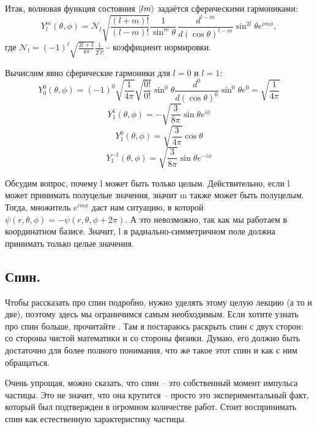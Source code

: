 Итак, волновая функция состояния $\ket{lm}$ задаётся сферическими гармониками:
\[
Y^m_l(\theta, \phi) = \mathcal{N}_l\sqrt{\frac{(l+m)!}{(l-m)!}} \frac{1}{\sin^{m}\theta}\,\frac{d^{l-m}}{d(\cos\theta)^{l-m}}\sin^{2l}\theta e^{im\phi},
\]
где $\mathcal{N}_l = (-1)^l \sqrt{\frac{2l+1}{4\pi}}\frac{1}{2^l l!}$ - коэффициент нормировки.

Вычислим явно сферические гармоники для $l=0$ и $l=1$:
\[
Y^0_0(\theta,\phi) = (-1)^0\sqrt{\frac{1}{4\pi}}\sqrt{\frac{0!}{0!}}\sin^0\theta \frac{d^0}{d(\cos\theta)^0} \sin^0 \theta e^{0} = \sqrt{\frac{1}{4\pi}}
\]
\[
Y^1_1(\theta,\phi) = -\sqrt{\frac{3}{8\pi}}\sin\theta e^{i\phi}
\]
\[
Y^0_1(\theta,\phi) = \sqrt{\frac{3}{4\pi}}\cos\theta
\]
\[
Y^{-1}_1(\theta,\phi) = \sqrt{\frac{3}{8\pi}}\sin\theta e^{-i\phi}
\]

Обсудим вопрос, почему l может быть только целым. Действительно, если l может принимать полуцелые значения, значит m также может быть полуцелым. Тогда, множитель $e^{im\phi}$ даст нам ситуацию, в которой $\psi(r, \theta, \phi) = -\psi(r, \theta, \phi + 2\pi)$. А это невозможно, так как мы работаем в координатном базисе. Значит, l в радиально-симметричном поле должна принимать только целые значения.

\subsection*{Спин.}
Чтобы рассказать про спин подробно, нужно уделять этому целую лекцию (а то и две), поэтому здесь мы ограничимся самым необходимым. Если хотите узнать про спин больше, прочитайте . Там я постараюсь раскрыть спин с двух сторон: со стороны чистой математики и со стороны физики. Думаю, его должно быть достаточно для более полного понимания, что же такое этот спин и как с ним обращаться.

Очень упрощая, можно сказать, что спин -- это собственный момент импульса частицы. Это не значит, что она крутится -- просто это экспериментальный факт, который был подтвержден в огромном количестве работ. Стоит воспринимать спин как естественную характеристику частицы.

